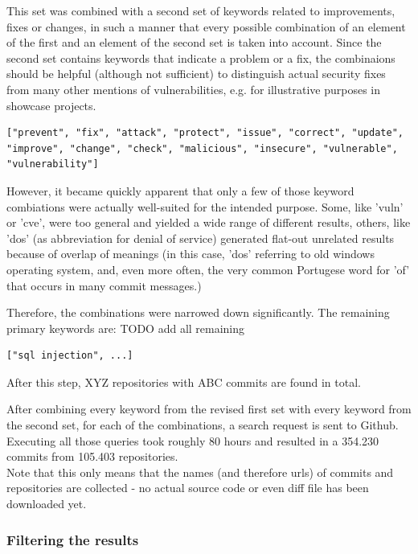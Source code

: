 \documentclass[
	a4paper,
	pagesize,
	pdftex,
	12pt,
	twoside, %
	BCOR=5mm, %
	ngerman,
	fleqn,
	final,
	]{scrartcl}
\begin{document}
This set was combined with a second set of keywords related to improvements, fixes or changes, in such a manner that every possible combination of an element of the first and an element of the second set is taken into account. Since the second set contains keywords that indicate a problem or a fix, the combinaions should be helpful (although not sufficient) to distinguish actual security fixes from many other mentions of vulnerabilities, e.g. for illustrative purposes in showcase projects.
\begin{lstlisting}
["prevent", "fix", "attack", "protect", "issue", "correct", "update", "improve", "change", "check", "malicious", "insecure", "vulnerable", "vulnerability"]
\end{lstlisting}
However, it became quickly apparent that only a few of those keyword combiations were actually well-suited for the intended purpose. Some, like 'vuln' or 'cve', were too general and yielded a wide range of different results, others, like 'dos' (as abbreviation for denial of service) generated flat-out unrelated results because of overlap of meanings (in this case, 'dos' referring to old windows operating system, and, even more often, the very common Portugese word for 'of' that occurs in many commit messages.)

Therefore, the combinations were narrowed down significantly. The remaining primary keywords are:
TODO add all remaining %
\begin{lstlisting}
["sql injection", ...]
\end{lstlisting}
After this step, XYZ repositories with ABC commits are found in total.

After combining every keyword from the revised first set with every keyword from the second set, for each of the combinations, a search request is sent to Github. Executing all those queries took roughly 80 hours and resulted in a 354.230 commits from 105.403 repositories.\\
Note that this only means that the names (and therefore urls) of commits and repositories are collected - no actual source code or even diff file has been downloaded yet.

\subsubsection{Filtering the results}
\end{document}
